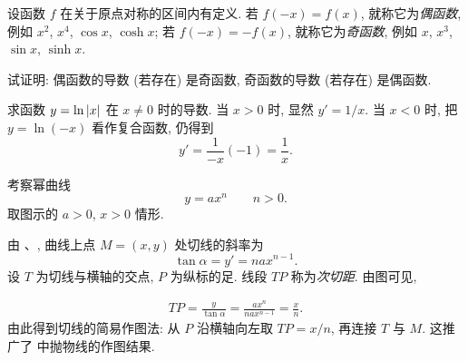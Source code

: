 \label{ex:derivative_parity}
设函数 $f$ 在关于原点对称的区间内有定义.
若 $f(-x)=f(x)$, 就称它为\emph{偶函数},
例如 $x^2$, $x^4$, $\cos x$, $\cosh x$;
若 $f(-x)=-f(x)$, 就称它为\emph{奇函数},
例如 $x$, $x^3$, $\sin x$, $\sinh x$.

试证明: {\kaishu 偶函数的导数 (若存在) 是奇函数,
奇函数的导数 (若存在) 是偶函数.}

\label{ex:differentiate_log_absolute_value}
求函数 $y=\ln\left| x \right|$ 在 $x\ne0$ 时的导数.
当 $x>0$ 时, 显然 $y'=1/x$.
当 $x<0$ 时, 把 $y=\ln(-x)$ 看作复合函数, 仍得到
$$
y'=\frac1{-x}(-1)=\frac1x.
$$

\par\noindent\begin{minipage}{\linewidth}
\setlength{\parindent}{2em}
\label{ex:subtangent_power_curve}
考察幂曲线 $$y=ax^n\qquad n>0.$$
取图示的 $a>0$, $x>0$ 情形.

\par\noindent
\begin{minipage}[c]{0.60\linewidth}
由 、, 曲线上点 $M=(x,y)$ 处切线的斜率为
$$
\tan\alpha=y'=nax^{n-1}.
$$
设 $T$ 为切线与横轴的交点, $P$ 为纵标的足.
线段 $TP$ 称为\emph{次切距}.
由图可见,
\end{minipage}\hfill
\begin{minipage}[c]{0.37\linewidth}
\centering
{}\label{fig:power_curve_subtangent}
\end{minipage}
\par
\begin{align*}
TP=\frac y{\tan\alpha}=\frac{ax^n}{nax^{n-1}}=\frac xn.
\end{align*}
由此得到切线的简易作图法: 从 $P$ 沿横轴向左取 $TP=x/n$, 再连接 $T$ 与 $M$.
这推广了  中抛物线的作图结果.
\end{minipage}
\par\medskip

